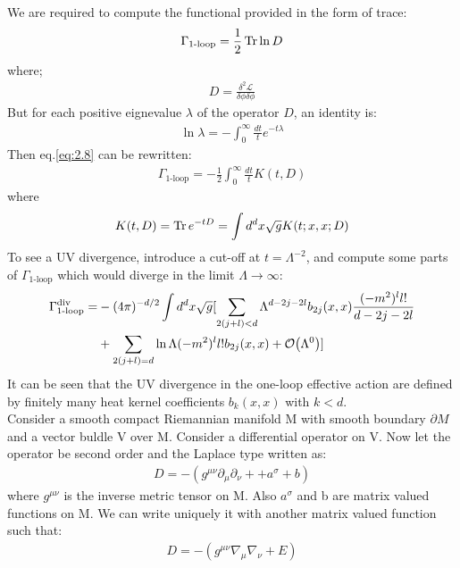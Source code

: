 \indent We are required to compute the functional provided in the form of trace:
\begin{align}
    \Gamma_{\text{1-loop}} = \frac{1}{2} \Tr \ln D
\end{align}
where;
\begin{align}
    D = \frac{\delta^2 \mathcal{L}}{\delta \phi \delta \phi} 
\end{align}
But for each positive eignevalue $\lambda$ of the operator $D$, an identity is:
\begin{align}
    \ln \lambda = -\int _{0} ^{\infty} \frac{dt}{t} e^{-t\lambda}
\end{align}
Then eq.\ref{eq:2.8} can be rewritten:
\begin{align}
    \label{eq:61}
    \Gamma _{\text{1-loop}} = -\frac{1}{2} \int _{0}^{\infty} \frac{dt}{t} K(t,D)
\end{align}
where 
\begin{align}
    K(t,D) = \Tr e^{-tD} = \int d^{d} x \sqrt{g} K(t;x,x;D)
\end{align}
To see a UV divergence, introduce a cut-off at $t=\Lambda ^{-2}$, and compute some parts of $\Gamma _{\text{1-loop}}$ which would diverge in the limit $\Lambda \to \infty$:
\begin{align}
    \begin{split}
    \Gamma _{\text{1-loop}} ^{\text{div}} =&  -(4\pi)^{-d/2} \int d^{d} x \sqrt{g} [ \sum_{2(j+l)< d} \Lambda ^{d-2j-2l} b_{2j}(x,x) \frac{(-m^{2})^{l} l!} {d-2j-2l}  \\
    &+ \sum_{2(j+l) =d} \ln \Lambda (-m^{2})^{l} l! b_{2j} (x,x) + \order {\Lambda ^{0}} ] 
    \end{split}
\end{align}
It can be seen that the UV divergence in the one-loop effective action are defined by finitely many heat kernel coefficients $b_{k} (x,x)$ with $k<d$. \\
\indent Consider a smooth compact Riemannian manifold M with smooth boundary $\partial M$ and a vector buldle V over M. Consider a differential operator on V. Now let the operator be second order and the Laplace type written as:
\begin{align}
    D = -(g^{\mu \nu} \partial _{\mu} \partial _{\nu} + + a^{\sigma} + b)
\end{align}
where $g^{\mu \nu}$ is the inverse metric tensor on M. Also $a^{\sigma}$ and b are matrix valued functions on M. We can write uniquely it with another matrix valued function such that:
\begin{align}
    D = - (g^{\mu \nu} \nabla _{\mu} \nabla _{\nu} + E)
\end{align}
